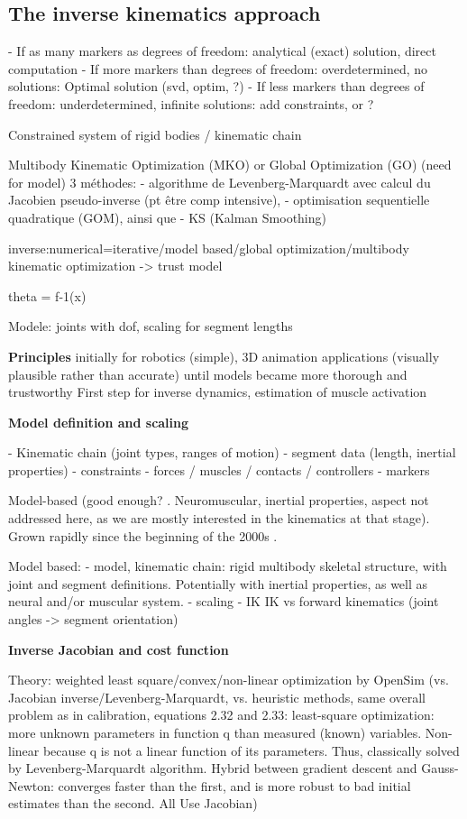 \newpage
\subsection{The inverse kinematics approach}

- If as many markers as degrees of freedom: analytical (exact) solution, direct computation
- If more markers than degrees of freedom: overdetermined, no solutions: Optimal solution (svd, optim, ?)
- If less markers than degrees of freedom: underdetermined, infinite solutions: add constraints, or ?

Constrained system of rigid bodies / kinematic chain

Multibody Kinematic Optimization (MKO) or Global Optimization (GO) (need for model)
3 méthodes: 
- algorithme de Levenberg-Marquardt avec calcul du Jacobien pseudo-inverse (pt être comp intensive), 
- optimisation sequentielle quadratique (GOM), ainsi que 
- KS (Kalman Smoothing)

inverse:numerical=iterative/model based/global optimization/multibody kinematic optimization
-> trust model

theta = f-1(x)


Modele: joints with dof, scaling for segment lengths


\textbf{Principles}
initially for robotics (simple), 3D animation applications (visually plausible rather than accurate) until models became more thorough and trustworthy
First step for inverse dynamics, estimation of muscle activation 


\textbf{Model definition and scaling}

- Kinematic chain (joint types, ranges of motion) 
- segment data (length, inertial properties)
- constraints
- forces / muscles / contacts / controllers
- markers


Model-based (good enough? \cite{Hicks2015}. Neuromuscular, inertial properties, aspect not addressed here, as we are mostly interested in the kinematics at that stage).
Grown rapidly since the beginning of the 2000s \cite{Hicks2015}.

Model based:
- model, kinematic chain: rigid multibody skeletal structure, with joint and segment definitions. Potentially with inertial properties, as well as neural and/or muscular system.
- scaling
- IK
IK vs forward kinematics (joint angles -> segment orientation)

\textbf{Inverse Jacobian and cost function}


Theory: weighted least square/convex/non-linear optimization by OpenSim (vs. Jacobian inverse/Levenberg-Marquardt, vs. heuristic methods, same overall problem as in calibration, equations 2.32 and 2.33: least-square optimization: more unknown parameters in function q than measured (known) variables. Non-linear because q is not a linear function of its parameters. Thus, classically solved by Levenberg-Marquardt algorithm. Hybrid between gradient descent and Gauss-Newton: converges faster than the first, and is more robust to bad initial estimates than the second. All Use Jacobian)


